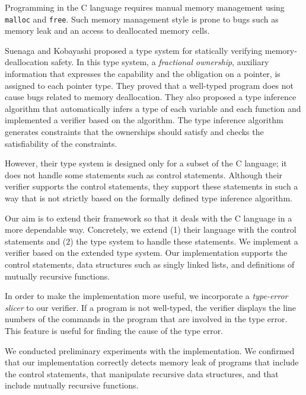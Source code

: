 \begin{eabstract}

  Programming in the C language requires manual memory management using
  \verb|malloc| and \verb|free|.  Such memory management style is prone
  to bugs such as memory leak and an access to deallocated memory cells.

  Suenaga and Kobayashi proposed a type system for statically verifying
  memory-deallocation safety.  In this type system, a \emph {fractional
  ownership}, auxiliary information that expresses the capability and
  the obligation on a pointer, is assigned to each pointer type.  They
  proved that a well-typed program does not cause bugs related to memory
  deallocation.  They also proposed a type inference algorithm that
  automatically infers a type of each variable and each function and
  implemented a verifier based on the algorithm.  The type inference
  algorithm generates constraints that the ownerships should satisfy and
  checks the satisfiability of the constraints.

  However, their type system is designed only for a subset of the C
  language; it does not handle some statements such as control
  statements. Although their verifier supports the control statements,
  they support these statements in such a way that is not strictly based
  on the formally defined type inference algorithm.




  Our aim is to extend their framework so that it deals with the C
  language in a more dependable way.  Concretely, we extend (1) their
  language with the control statements and (2) the type system to handle
  these statements. We implement a verifier based on the extended type
  system.  Our implementation supports the control statements, data
  structures such as singly linked lists, and definitions of mutually
  recursive functions.

  In order to make the implementation more useful, we incorporate a
  \emph{type-error slicer} to our verifier.  If a program is not
  well-typed, the verifier displays the line numbers of the commands in
  the program that are involved in the type error. This feature is
  useful for finding the cause of the type error.

  We conducted preliminary experiments with the implementation.  We
  confirmed that our implementation correctly detects memory leak of
  programs that include the control statements, that manipulate
  recursive data structures, and that include mutually recursive
  functions.

\end{eabstract}